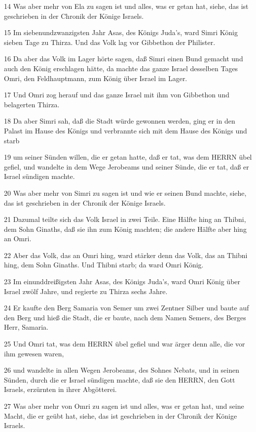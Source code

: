 \par 14 Was aber mehr von Ela zu sagen ist und alles, was er getan hat, siehe, das ist geschrieben in der Chronik der Könige Israels.
\par 15 Im siebenundzwanzigsten Jahr Asas, des Königs Juda's, ward Simri König sieben Tage zu Thirza. Und das Volk lag vor Gibbethon der Philister.
\par 16 Da aber das Volk im Lager hörte sagen, daß Simri einen Bund gemacht und auch den König erschlagen hätte, da machte das ganze Israel desselben Tages Omri, den Feldhauptmann, zum König über Israel im Lager.
\par 17 Und Omri zog herauf und das ganze Israel mit ihm von Gibbethon und belagerten Thirza.
\par 18 Da aber Simri sah, daß die Stadt würde gewonnen werden, ging er in den Palast im Hause des Königs und verbrannte sich mit dem Hause des Königs und starb
\par 19 um seiner Sünden willen, die er getan hatte, daß er tat, was dem HERRN übel gefiel, und wandelte in dem Wege Jerobeams und seiner Sünde, die er tat, daß er Israel sündigen machte.
\par 20 Was aber mehr von Simri zu sagen ist und wie er seinen Bund machte, siehe, das ist geschrieben in der Chronik der Könige Israels.
\par 21 Dazumal teilte sich das Volk Israel in zwei Teile. Eine Hälfte hing an Thibni, dem Sohn Ginaths, daß sie ihn zum König machten; die andere Hälfte aber hing an Omri.
\par 22 Aber das Volk, das an Omri hing, ward stärker denn das Volk, das an Thibni hing, dem Sohn Ginaths. Und Thibni starb; da ward Omri König.
\par 23 Im einunddreißigsten Jahr Asas, des Königs Juda's, ward Omri König über Israel zwölf Jahre, und regierte zu Thirza sechs Jahre.
\par 24 Er kaufte den Berg Samaria von Semer um zwei Zentner Silber und baute auf den Berg und hieß die Stadt, die er baute, nach dem Namen Semers, des Berges Herr, Samaria.
\par 25 Und Omri tat, was dem HERRN übel gefiel und war ärger denn alle, die vor ihm gewesen waren,
\par 26 und wandelte in allen Wegen Jerobeams, des Sohnes Nebats, und in seinen Sünden, durch die er Israel sündigen machte, daß sie den HERRN, den Gott Israels, erzürnten in ihrer Abgötterei.
\par 27 Was aber mehr von Omri zu sagen ist und alles, was er getan hat, und seine Macht, die er geübt hat, siehe, das ist geschrieben in der Chronik der Könige Israels.
